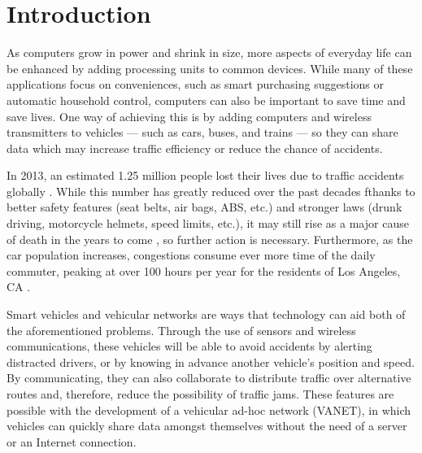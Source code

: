 \chapter{Introduction}





As computers grow in power and shrink in size, more aspects of everyday life can be enhanced by adding processing units to common devices.
While many of these applications focus on conveniences, such as smart purchasing suggestions or automatic household control, computers can also be important to save time and save lives.
One way of achieving this is by adding computers and wireless transmitters to vehicles — such as cars, buses, and trains — so they can share data which may increase traffic efficiency or reduce the chance of accidents.

In 2013, an estimated 1.25 million people lost their lives due to traffic accidents globally \cite{whotraffic}.
While this number has greatly reduced over the past decades \cite{johnson2010traffic} fthanks to better safety features (seat belts, air bags, ABS, etc.) and stronger laws (drunk driving, motorcycle helmets, speed limits, etc.), it may still rise as a major cause of death in the years to come \cite{whofactsheet}, so further action is necessary.
Furthermore, as the car population increases, congestions consume ever more time of the daily commuter, peaking at over 100 hours per year for the residents of Los Angeles, CA \cite{inrixtraffic}.

Smart vehicles and vehicular networks are ways that technology can aid both of the aforementioned problems.
Through the use of sensors and wireless communications, these vehicles will be able to avoid accidents by alerting distracted drivers, or by knowing in advance another vehicle's position and speed.
By communicating, they can also collaborate to distribute traffic over alternative routes and, therefore, reduce the possibility of traffic jams.
These features are possible with the development of a vehicular ad-hoc network (VANET), in which vehicles can quickly share data amongst themselves without the need of a server or an Internet connection.

